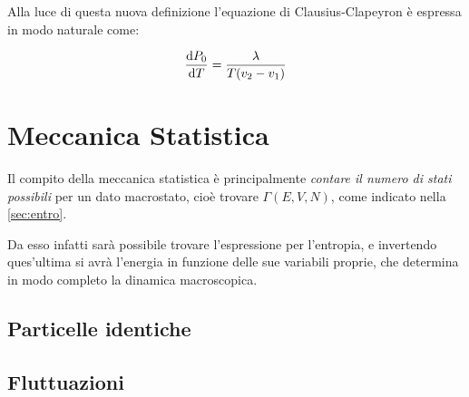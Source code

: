 Alla luce di questa nuova definizione l'equazione di Clausius-Clapeyron è espressa in modo naturale come:

\begin{equation*}
\derivative{ P_0}{T} = \frac{\lambda}{T(v_2 - v_1)}
\end{equation*}

\section{Meccanica Statistica}
\label{sec:statmech}

Il compito della meccanica statistica è principalmente \textit{contare il numero di stati possibili} per un dato macrostato, cioè trovare $\Gamma(E,V,N)$, come indicato nella \cref{sec:entro}.

Da esso infatti sarà possibile trovare l'espressione per l'entropia, e invertendo ques'ultima si avrà l'energia in funzione delle sue variabili proprie, che determina in modo completo la dinamica macroscopica.

\subsection{Particelle identiche}
\label{sec:idpart}

\subsection{Fluttuazioni}
\label{sec:fluct}